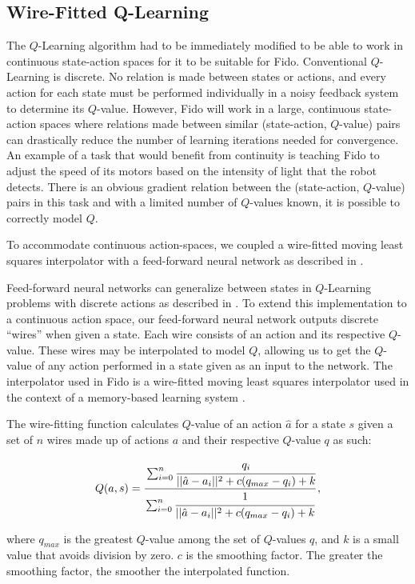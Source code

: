 \subsection{Wire-Fitted Q-Learning}

The $Q$-Learning algorithm had to be immediately modified to be able to work in continuous state-action spaces for it to be suitable for Fido.
Conventional $Q$-Learning is discrete.
No relation is made between states or actions, and every action for each state must be performed individually in a noisy feedback system to determine its $Q$-value.
However, Fido will work in a large, continuous state-action spaces where relations made between similar (state-action, $Q$-value) pairs can drastically reduce the number of learning iterations needed for convergence.
An example of a task that would benefit from continuity is teaching Fido to adjust the speed of its motors based on the intensity of light that the robot detects.
There is an obvious gradient relation between the (state-action, $Q$-value) pairs in this task and with a limited number of $Q$-values known, it is possible to correctly model $Q$.

To accommodate continuous action-spaces, we coupled a wire-fitted moving least squares interpolator with a feed-forward neural network as described in \cite{gaskett}.

Feed-forward neural networks can generalize between states in $Q$-Learning problems with discrete actions as described in \cite{rummery}.
To extend this implementation to a continuous action space, our feed-forward neural network outputs discrete ``wires'' when given a state.
Each wire consists of an action and its respective $Q$-value.
These wires may be interpolated to model $Q$, allowing us to get the $Q$-value of any action performed in a state given as an input to the network.
The interpolator used in Fido is a wire-fitted moving least squares interpolator used in the context of a memory-based learning system \cite{baird}.

The wire-fitting function calculates $Q$-value of an action $\hat{a}$ for a state $s$ given a set of $n$ wires made up of actions $a$ and their respective $Q$-value $q$ as such:

\begin{equation}
	Q(a, s) = \cfrac{\sum_{i=0}^{n}\cfrac{q_i}{||\hat{a}-a_i||^2+c(q_{max}-q_i)+k}}{\sum_{i=0}^{n}\cfrac{1}{||\hat{a}-a_i||^2+c(q_{max}-q_i)+k}}
	\,,
\end{equation}

\noindent
where $q_{max}$ is the greatest $Q$-value among the set of $Q$-values $q$, and $k$ is a small value that avoids division by zero.
$c$ is the smoothing factor.
The greater the smoothing factor, the smoother the interpolated function.


